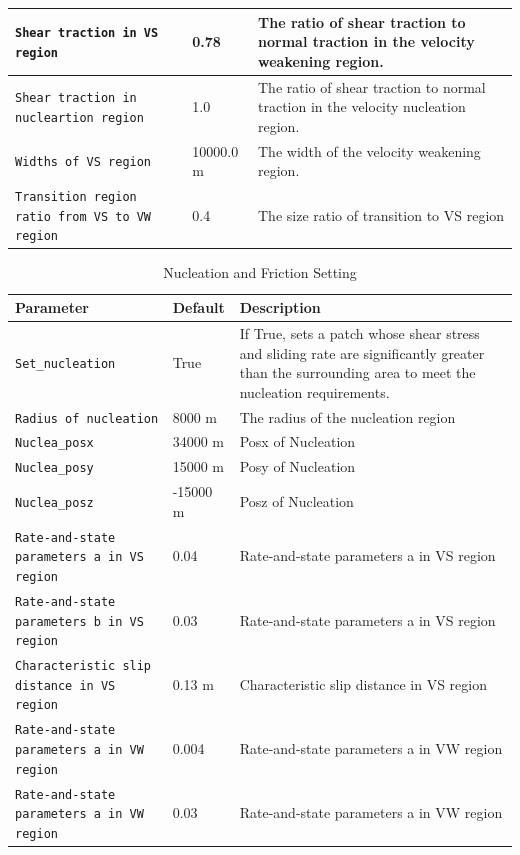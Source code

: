 \documentclass[a4paper,12pt]{article}
\begin{document}
\begin{table}[h!]
\begin{tabular}{|m{3.5cm}|m{2cm}|m{9cm}|}
        \hline
\texttt{Shear traction in VS region} & 0.78& The ratio of shear traction to normal traction in the velocity weakening region.\\
        \hline
\texttt{Shear traction in nucleartion region} & 1.0& The ratio of shear traction to normal traction in the velocity nucleation region.\\
        \hline
\texttt{Widths of VS region} & 10000.0 m& The width of the velocity weakening region.\\
        \hline
\texttt{Transition region ratio from VS to VW region} & 0.4& The size ratio of transition to VS region\\
        \hline
    \end{tabular}
\end{table}

\begin{table}[h!]
    \centering
    \caption{Nucleation and Friction Setting}
    \label{tab:Nucleation and Friction Setting}
    \begin{tabular}{|m{3.5cm}|m{2cm}|m{9cm}|}
        \hline
        \textbf{Parameter} & \textbf{Default} & \textbf{Description} \\
\hline
        \texttt{Set\_nucleation} & True& If True, sets a patch whose shear stress and sliding rate are significantly greater than the surrounding area to meet the nucleation requirements.\\
        \hline
\texttt{Radius of nucleation} & 8000 m& The radius of the nucleation region\\
        \hline
\texttt{Nuclea\_posx} & 34000 m&  Posx of Nucleation\\
        \hline
\texttt{Nuclea\_posy} & 15000 m& Posy of Nucleation\\
        \hline
\texttt{Nuclea\_posz} & -15000 m& Posz of Nucleation\\
        \hline
\texttt{Rate-and-state parameters a in VS region} & 0.04& Rate-and-state parameters a in VS region\\
        \hline
\texttt{Rate-and-state parameters b in VS region} & 0.03& Rate-and-state parameters a in VS region\\
        \hline
\texttt{Characteristic slip distance in VS region} & 0.13 m& Characteristic slip distance in VS region\\
        \hline
\texttt{Rate-and-state parameters a in VW region} & 0.004& Rate-and-state parameters a in VW region\\
        \hline
\texttt{Rate-and-state parameters a in VW region} & 0.03& Rate-and-state parameters a in VW region\\

\end{tabular}
\end{table}
\end{document}
